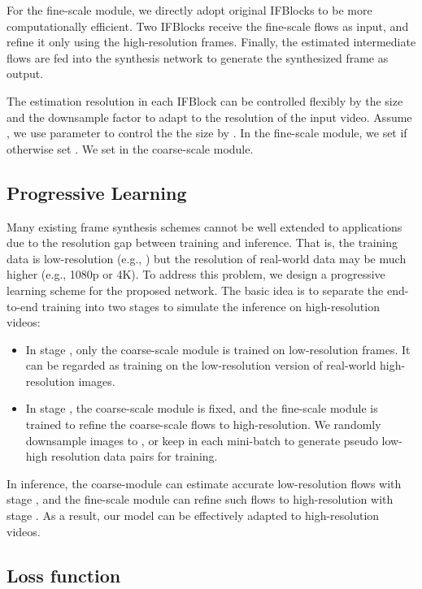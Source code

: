 \documentclass[sigconf]{acmart}
\begin{document}
For the fine-scale module, we directly adopt original IFBlocks to be more computationally efficient. Two IFBlocks receive the fine-scale flows as input, and refine it only using the high-resolution frames. Finally, the estimated intermediate flows are fed into the synthesis network to generate the synthesized frame  as output.

The estimation resolution in each IFBlock can be controlled flexibly by the size  and the downsample factor  to adapt to the resolution of the input video. Assume , we use parameter  to control the the size by . In the fine-scale module, we set  if  otherwise set . We set  in the coarse-scale module.
 
\subsection{Progressive Learning}
\label{sec:3-3}

Many existing frame synthesis schemes cannot be well extended to applications due to the resolution gap between training and inference. That is, the training data is low-resolution (e.g., ) but the resolution of real-world data may be much higher (e.g., 1080p or 4K). To address this problem, we design a progressive learning scheme for the proposed network. The basic idea is to separate the end-to-end training into two stages to simulate the inference on high-resolution videos: 
\begin{itemize}
\item In stage \uppercase\expandafter{}, only the coarse-scale module is trained on low-resolution  frames. It can be regarded as training on the low-resolution version of real-world high-resolution images.
\item In stage \uppercase\expandafter{}, the coarse-scale module is fixed, and the fine-scale module is trained to refine the coarse-scale flows to high-resolution. We randomly downsample images to ,  or keep  in each mini-batch to generate pseudo low-high resolution data pairs for training.
\end{itemize}
In inference, the coarse-module can estimate accurate low-resolution flows with stage \uppercase\expandafter{}, and the fine-scale module can refine such flows to high-resolution with stage \uppercase\expandafter{}. As a result, our model can be effectively adapted to high-resolution videos.


\subsection{Loss function}
\label{sec:3-4}
\end{document}
